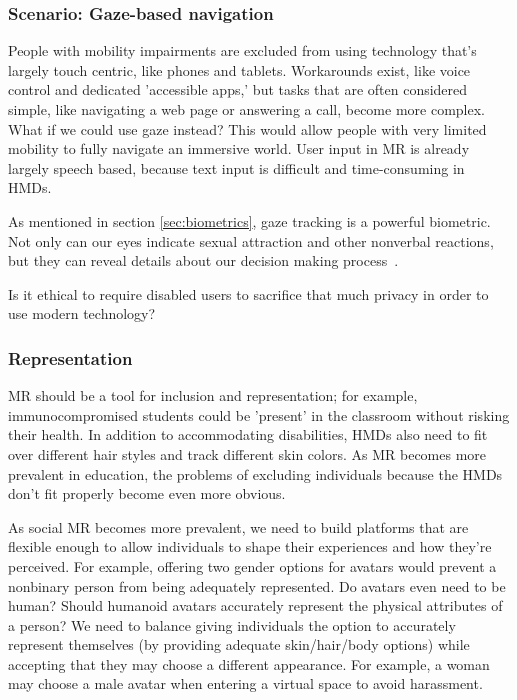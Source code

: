 \subsubsection{Scenario: Gaze-based navigation}

People with mobility impairments are excluded from using technology that's largely touch centric, like phones and tablets. Workarounds exist, like voice control and dedicated 'accessible apps,' but tasks that are often considered simple, like navigating a web page or answering a call, become more complex. What if we could use gaze instead? This would allow people with very limited mobility to fully navigate an immersive world. User input in MR is already largely speech based, because text input is difficult and time-consuming in HMDs.

As mentioned in section \ref{sec:biometrics}, gaze tracking is a powerful biometric. Not only can our eyes indicate sexual attraction and other nonverbal reactions, but they can reveal details about our decision making process~\cite{costandi}.

Is it ethical to require disabled users to sacrifice that much privacy in order to use modern technology?


\subsubsection{Representation}

MR should be a tool for inclusion and representation; for example, immunocompromised students could be 'present' in the classroom without risking their health.  In addition to accommodating disabilities, HMDs also need to fit over different hair styles and track different skin colors. As MR becomes more prevalent in education, the problems of excluding individuals because the HMDs don't fit properly become even more obvious.

As social MR becomes more prevalent, we need to build platforms that are flexible enough to allow individuals to shape their experiences and how they're perceived. For example, offering two gender options for avatars would prevent a nonbinary person from being adequately represented. Do avatars even need to be human? Should humanoid avatars accurately represent the physical attributes of a person? We need to balance giving individuals the option to accurately represent themselves (by providing adequate skin/hair/body options) while accepting that they may choose a different appearance. For example, a woman may choose a male avatar when entering a virtual space to avoid harassment.

